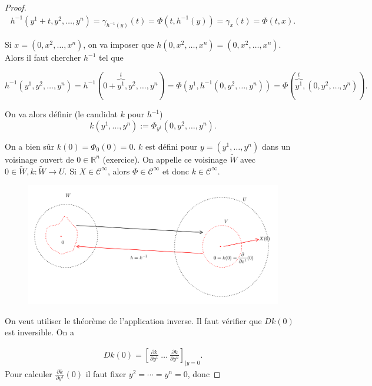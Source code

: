 \documentclass[french]{article}
\theoremstyle{definition}
\begin{document}
\begin{proof}
\begin{gather*}
  h ^{-1}(y^1+t, y^2, \dots, y^n) = \gamma_{h ^{-1}(y)}(t) = \Phi(t,h ^{-1}(y)) = \gamma_x(t) = \Phi(t,x).
\end{gather*}

Si \(x= (0, x^2, \dots, x^n)\), on va imposer que \(h(0, x^2, \dots, x^n) = (0, x^2, \dots, x^n)\). Alors il faut chercher \(h ^{-1}\) tel que

\[h ^{-1}(y^1, y^2, \dots, y^n) = h ^{-1}(0+\overbrace{y^1}^{t}, y^2, \dots, y^n) = \Phi(y^1, h ^{-1}(0,y^2, \dots, y^n)) = \Phi(\overbrace{y^1}^{t},  (0 , y^2, \dots, y^n)).\]

  On va alors définir (le candidat \(k\) pour \(h ^{-1}\)) \[k(y^1, \dots, y^n) := \Phi _{y^1}(0, y^2, \dots,y^n).\]

  On a bien sûr \(k(0) = \Phi_0(0) = 0\). \(k\) est défini pour \(y = (y^1, \dots, y^n)\) dans un voisinage ouvert de \(0 \in \mathbb{R}^n\) (exercice). On appelle ce voisinage \(\widetilde{W}\) avec \(0 \in \widetilde{W}, k : \widetilde{W} \longrightarrow U\). Si \(X \in \mathcal{C}^\infty\), alors \(\Phi \in \mathcal{C}^\infty\) et donc \(k \in \mathcal{C}^\infty\).


  \begin{figure}
    \centering
    \includegraphics[scale=0.3]{figures/fig7.png}
    \caption{}
    \label{}
  \end{figure}

  On veut utiliser le théorème de l'application inverse. Il faut vérifier que \(D k(0)\) est inversible. On a

  \begin{gather*}
    Dk(0) = \left[ \frac{\partial k }{\partial y^{1}} \ \dots \ \frac{\partial k }{\partial y^{n}}  \right]_{\mid y=0}.    \end{gather*}
Pour calculer $\displaystyle \frac{\partial k}{\partial y^1}(0)$ il faut fixer $y^2 = \cdots= y^n=0$, donc


\end{proof}
\end{document}
